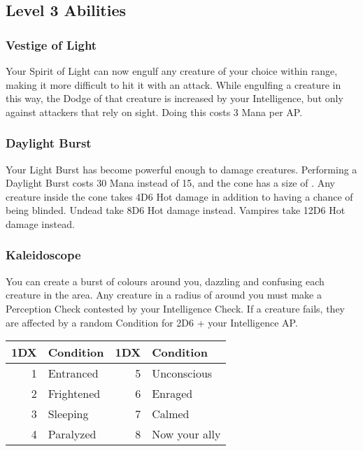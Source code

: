 \subsection{Level 3 Abilities}

\subsubsection{Vestige of Light}
Your Spirit of Light can now engulf any creature of your choice within range, making it more difficult to hit it with an attack.
While engulfing a creature in this way, the Dodge of that creature is increased by your Intelligence, but only against attackers that rely on sight.
Doing this costs 3 Mana per AP.

\subsubsection{Daylight Burst}
Your Light Burst has become powerful enough to damage creatures.
Performing a Daylight Burst costs 30 Mana instead of 15, and the cone has a size of .
Any creature inside the cone takes 4D6 Hot damage in addition to having a chance of being blinded.
Undead take 8D6 Hot damage instead.
Vampires take 12D6 Hot damage instead.

\subsubsection{Kaleidoscope}
You can create a burst of colours around you, dazzling and confusing each creature in the area.
Any creature in a radius of  around you must make a Perception Check contested by your Intelligence Check.
If a creature fails, they are affected by a random Condition for 2D6 + your Intelligence AP.\\

\begin{tabular}{r | l || r | l}
	1DX & Condition & 1DX & Condition\\
	\hline
	1 & Entranced & 5 & Unconscious \\
	2 & Frightened & 6 & Enraged \\
	3 & Sleeping & 7 & Calmed\\
	4 & Paralyzed & 8 & Now your ally \\
\end{tabular}
\onecolumn